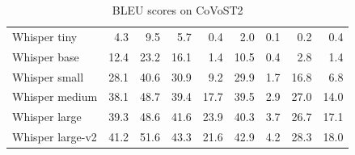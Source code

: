 \begin{table}[H]
\begin{tabular}{l|rrrrrrrr}
\\ \midrule
Whisper tiny 
& 4.3 & 9.5 & 5.7 & 0.4 & 2.0 & 0.1 & 0.2 & 0.4 
\\
Whisper base 
& 12.4 & 23.2 & 16.1 & 1.4 & 10.5 & 0.4 & 2.8 & 1.4 
\\
Whisper small 
& 28.1 & 40.6 & 30.9 & 9.2 & 29.9 & 1.7 & 16.8 & 6.8 
\\
Whisper medium 
& 38.1 & 48.7 & 39.4 & 17.7 & 39.5 & 2.9 & 27.0 & 14.0 
\\
Whisper large 
& 39.3 & 48.6 & 41.6 & 23.9 & 40.3 & 3.7 & 26.7 & 17.1 
\\
Whisper large-v2 
& 41.2 & 51.6 & 43.3 & 21.6 & 42.9 & 4.2 & 28.3 & 18.0 
\\
\bottomrule
\end{tabular}
\caption{BLEU scores on CoVoST2}\label{tab:covost2-translate}
\end{table}

